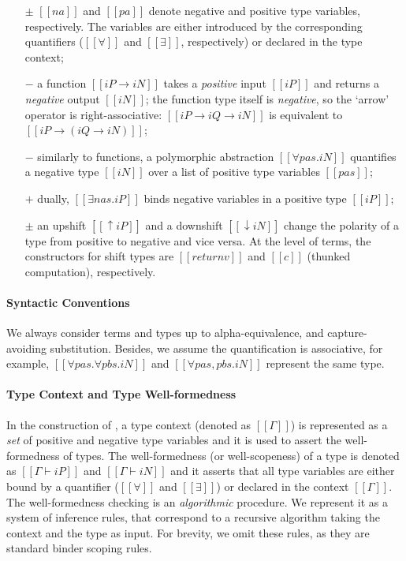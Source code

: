 \begin{itemize}
\item [$\pm$] $[[na]]$ and $[[pa]]$
  denote negative and positive type variables, respectively.
  The variables are either introduced by the corresponding quantifiers 
  ($[[∀]]$ and $[[∃]]$, respectively) or declared in the type context;
\item [$-$] a function $[[iP → iN]]$ takes a \emph{positive} input $[[iP]]$ and
returns a \emph{negative} output $[[iN]]$; the function type itself is
\emph{negative}, so the `arrow' operator is right-associative: 
$[[iP → iQ → iN]]$ is equivalent to $[[iP → (iQ → iN)]]$;
\item [$-$] similarly to functions, a polymorphic abstraction $[[∀pas.iN]]$
  quantifies a negative type $[[iN]]$ over a list of positive type variables $[[pas]]$;
\item [$+$] dually, $[[∃nas.iP]]$ binds negative variables in a positive type $[[iP]]$;
\item [$\pm$] an upshift $[[↑iP]]$ and a downshift $[[↓iN]]$ change the polarity of a type
  from positive to negative and vice versa.
  At the level of terms, the constructors for shift types are
  $[[return v]]$ and $[[{c}]]$ (thunked computation), respectively.
\end{itemize}


\paragraph{Syntactic Conventions}
We always consider terms and types up to alpha-equivalence, and capture-avoiding
substitution. Besides, we assume the quantification is associative,
for example, $[[∀pas.∀pbs.iN]]$ and $[[∀pas,pbs.iN]]$
represent the same type.

\paragraph{Type Context and Type Well-formedness}

In the construction of \fexists, a type context (denoted as $[[Γ]]$) is
represented as a \emph{set} of positive and negative type variables and it is
used to assert the well-formedness of types. The well-formedness (or
well-scopeness) of a type is denoted as $[[Γ ⊢ iP]]$ and $[[Γ ⊢ iN]]$ and it
asserts that all type variables are either bound by a quantifier ($[[∀]]$ and
$[[∃]]$) or declared in the context $[[Γ]]$. The well-formedness checking is an
\emph{algorithmic} procedure. We represent it as a system of inference rules,
that correspond to a recursive algorithm taking the context and the type as
input. For brevity, we omit these rules, as they are standard binder scoping
rules.

